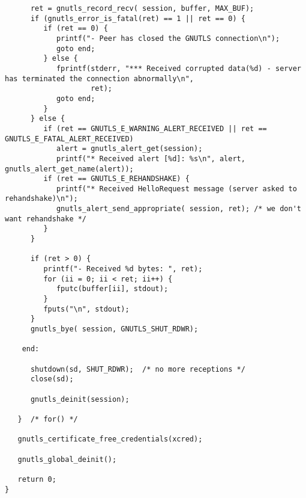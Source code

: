 \begin{verbatim}
      ret = gnutls_record_recv( session, buffer, MAX_BUF);
      if (gnutls_error_is_fatal(ret) == 1 || ret == 0) {
         if (ret == 0) {
            printf("- Peer has closed the GNUTLS connection\n");
            goto end;
         } else {
            fprintf(stderr, "*** Received corrupted data(%d) - server has terminated the connection abnormally\n",
                    ret);
            goto end;
         }
      } else {
         if (ret == GNUTLS_E_WARNING_ALERT_RECEIVED || ret == GNUTLS_E_FATAL_ALERT_RECEIVED)
            alert = gnutls_alert_get(session);
            printf("* Received alert [%d]: %s\n", alert, gnutls_alert_get_name(alert));
         if (ret == GNUTLS_E_REHANDSHAKE) {
            printf("* Received HelloRequest message (server asked to rehandshake)\n");
            gnutls_alert_send_appropriate( session, ret); /* we don't want rehandshake */
         }
      }

      if (ret > 0) {
         printf("- Received %d bytes: ", ret);
         for (ii = 0; ii < ret; ii++) {
            fputc(buffer[ii], stdout);
         }
         fputs("\n", stdout);
      }
      gnutls_bye( session, GNUTLS_SHUT_RDWR);

    end:

      shutdown(sd, SHUT_RDWR);  /* no more receptions */
      close(sd);

      gnutls_deinit(session);

   }  /* for() */

   gnutls_certificate_free_credentials(xcred);

   gnutls_global_deinit();

   return 0;
}

\end{verbatim}
